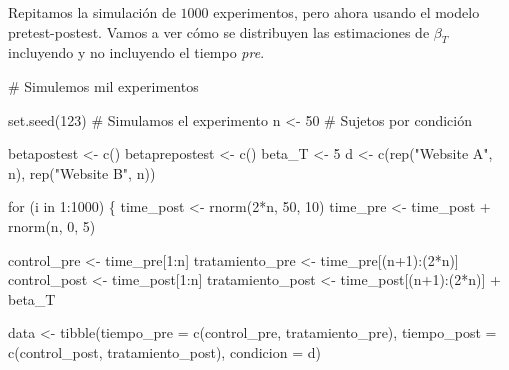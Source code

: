 \documentclass[
  letterpaper,
  DIV=11,
  numbers=noendperiod,
  oneside]{scrreprt}
\newenvironment{Shaded}{\begin{snugshade}}{\end{snugshade}}
\newcommand{\AttributeTok}[1]{\textcolor[rgb]{0.40,0.45,0.13}{#1}}
\newcommand{\CommentTok}[1]{\textcolor[rgb]{0.37,0.37,0.37}{#1}}
\newcommand{\ControlFlowTok}[1]{\textcolor[rgb]{0.00,0.23,0.31}{#1}}
\newcommand{\DecValTok}[1]{\textcolor[rgb]{0.68,0.00,0.00}{#1}}
\newcommand{\FunctionTok}[1]{\textcolor[rgb]{0.28,0.35,0.67}{#1}}
\newcommand{\NormalTok}[1]{\textcolor[rgb]{0.00,0.23,0.31}{#1}}
\newcommand{\OtherTok}[1]{\textcolor[rgb]{0.00,0.23,0.31}{#1}}
\newcommand{\SpecialCharTok}[1]{\textcolor[rgb]{0.37,0.37,0.37}{#1}}
\newcommand{\StringTok}[1]{\textcolor[rgb]{0.13,0.47,0.30}{#1}}
\begin{document}
Repitamos la simulación de \(1000\) experimentos, pero ahora usando el
modelo pretest-postest. Vamos a ver cómo se distribuyen las estimaciones
de \(\beta_T\) incluyendo y no incluyendo el tiempo \emph{pre}.

\begin{Shaded}
\begin{Highlighting}[]
\CommentTok{\# Simulemos mil experimentos}

\FunctionTok{set.seed}\NormalTok{(}\DecValTok{123}\NormalTok{)}
\CommentTok{\# Simulamos el experimento}
\NormalTok{n }\OtherTok{\textless{}{-}} \DecValTok{50} \CommentTok{\# Sujetos por condición}

\NormalTok{betapostest }\OtherTok{\textless{}{-}} \FunctionTok{c}\NormalTok{()}
\NormalTok{betaprepostest }\OtherTok{\textless{}{-}} \FunctionTok{c}\NormalTok{()}
\NormalTok{beta\_T }\OtherTok{\textless{}{-}} \DecValTok{5}
\NormalTok{d }\OtherTok{\textless{}{-}} \FunctionTok{c}\NormalTok{(}\FunctionTok{rep}\NormalTok{(}\StringTok{"Website A"}\NormalTok{, n), }\FunctionTok{rep}\NormalTok{(}\StringTok{"Website B"}\NormalTok{, n))}

\ControlFlowTok{for}\NormalTok{ (i }\ControlFlowTok{in} \DecValTok{1}\SpecialCharTok{:}\DecValTok{1000}\NormalTok{) \{}
\NormalTok{  time\_post }\OtherTok{\textless{}{-}} \FunctionTok{rnorm}\NormalTok{(}\DecValTok{2}\SpecialCharTok{*}\NormalTok{n, }\DecValTok{50}\NormalTok{, }\DecValTok{10}\NormalTok{)}
\NormalTok{  time\_pre }\OtherTok{\textless{}{-}}\NormalTok{ time\_post }\SpecialCharTok{+} \FunctionTok{rnorm}\NormalTok{(n,  }\DecValTok{0}\NormalTok{, }\DecValTok{5}\NormalTok{)}
  
\NormalTok{  control\_pre  }\OtherTok{\textless{}{-}}\NormalTok{ time\_pre[}\DecValTok{1}\SpecialCharTok{:}\NormalTok{n] }
\NormalTok{  tratamiento\_pre  }\OtherTok{\textless{}{-}}\NormalTok{ time\_pre[(n}\SpecialCharTok{+}\DecValTok{1}\NormalTok{)}\SpecialCharTok{:}\NormalTok{(}\DecValTok{2}\SpecialCharTok{*}\NormalTok{n)]}
\NormalTok{  control\_post }\OtherTok{\textless{}{-}}\NormalTok{ time\_post[}\DecValTok{1}\SpecialCharTok{:}\NormalTok{n] }
\NormalTok{  tratamiento\_post }\OtherTok{\textless{}{-}}\NormalTok{ time\_post[(n}\SpecialCharTok{+}\DecValTok{1}\NormalTok{)}\SpecialCharTok{:}\NormalTok{(}\DecValTok{2}\SpecialCharTok{*}\NormalTok{n)] }\SpecialCharTok{+}\NormalTok{ beta\_T}
  
\NormalTok{  data }\OtherTok{\textless{}{-}} \FunctionTok{tibble}\NormalTok{(}\AttributeTok{tiempo\_pre =} \FunctionTok{c}\NormalTok{(control\_pre, tratamiento\_pre),}
                     \AttributeTok{tiempo\_post =} \FunctionTok{c}\NormalTok{(control\_post, tratamiento\_post),}
                     \AttributeTok{condicion =}\NormalTok{ d)}
  

\end{Highlighting}
\end{Shaded}
\end{document}
